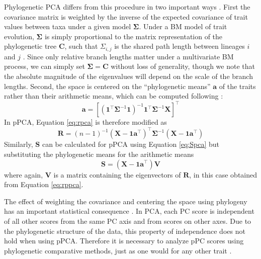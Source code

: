 \documentclass[a4paper,11pt]{article}
\begin{document}
Phylogenetic PCA differs from this procedure in two important ways \citep{Revell2008,Polly2013}. First the covariance matrix is weighted by the inverse of the expected covariance of trait values between taxa under a given model $\mathbf{\Sigma}$. Under a BM model of trait evolution, $\mathbf{\Sigma}$ is simply proportional to the matrix representation of the phylogenetic tree $\mathbf{C}$, such that $\Sigma_{i,j}$ is the shared path length between lineages $i$ and $j$ \citep{Rohlf2001}. Since only relative branch lengths matter under a multivariate BM process, we can simply set $\mathbf{\Sigma}=\mathbf{C}$ without loss of generality, though we note that the absolute magnitude of the eigenvalues will depend on the scale of the branch lengths. Second, the space is centered on the ``phylogenetic means'' $\mathbf{a}$ of the traits rather than their arithmetic means, which can be computed following \citet{RevellHarmon2008}:
\begin{equation}\label{eq:phymean}
\mathbf{a}=[(\mathbf{1}^\intercal \mathbf{\Sigma}^{-1} \mathbf{1})^{-1} 
\mathbf{1}^\intercal \mathbf{\Sigma}^{-1} \mathbf{X}]^\intercal
\end{equation}
In pPCA, Equation \ref{eq:rpca} is therefore modified as
\begin{equation}\label{eq:rppca}
\mathbf{R} = (n-1)^{-1}(\mathbf{X} - \mathbf{1a}^\intercal)^\intercal \mathbf{\Sigma}^{-1} (\mathbf{X} - \mathbf{1a}^\intercal)
\end{equation}
Similarly, $\mathbf{S}$ can be calculated for pPCA using Equation \ref{eq:Spca} but substituting the phylogenetic means for the arithmetic means
\begin{equation}\label{eq:Sppca}
\mathbf{S}=(\mathbf{X} - \mathbf{1a}^\intercal)\mathbf{V}
\end{equation}
where again, $\mathbf{V}$ is a matrix containing the eigenvectors of $\mathbf{R}$, in this case obtained from Equation \ref{eq:rppca}.

The effect of weighting the covariance and centering the space using phylogeny has an important statistical consequence \citep{Revell2008, Polly2013}. In PCA, each PC score is independent of all other scores from the same PC axis and from scores on other axes. Due to the phylogenetic structure of the data, this property of independence does not hold when using pPCA. Therefore it is necessary to analyze pPC scores using phylogenetic comparative methods, just as one would for any other trait \citep{Revell2008}.
\end{document}
